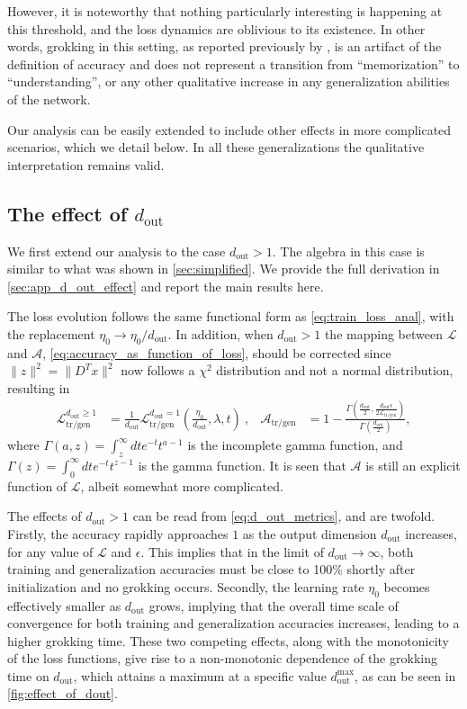 \documentclass[a4paper,11pt]{article}
\newcommand{\loss}{\mathcal{L}}
\newcommand{\norm}[1]{\| #1 \|}
\newcommand{\dout}{d_\mathrm{out}}
\newcommand{\training}{\mathrm{tr}}
\begin{document}
However, it is noteworthy that nothing particularly interesting is happening at this threshold, and the loss dynamics are oblivious to its existence. In other words, grokking in this setting, as reported previously by \cite{liu2023omnigrok}, is an artifact of the definition of accuracy and does not represent a transition from ``memorization'' to ``understanding'', or any other qualitative increase in any generalization abilities of the network.

Our analysis can be easily extended to include other effects in more complicated scenarios, which we detail below. In all these generalizations the qualitative interpretation remains valid.

\subsection{The effect of $\dout$}
\label{sec:d_out_main}
We first extend our analysis to the case $\dout>1$. The algebra in this case is similar to what was shown in \cref{sec:simplified}. We provide the full derivation in \cref{sec:app_d_out_effect} and report the main results here.

The loss evolution follows the same functional form as \cref{eq:train_loss_anal}, with the replacement $\eta_0 \to \eta_0/\dout$. In addition, when $\dout>1$ the mapping between $\loss$ and $\mathcal{A}$, \cref{eq:accuracy_as_function_of_loss}, should be corrected since $\norm{z}^2=\norm{D^Tx}^2$ now follows a $\chi^2$ distribution and not a normal distribution, resulting in
\begin{align}
    \label{eq:d_out_metrics}
    \mathcal{L}_\mathrm{\training/gen}^{\dout\geq 1} 
    &= 
    \frac{1}{\dout} 
    \mathcal{L}_\mathrm{\training/gen}^{\dout= 1} 
    \left( \frac{\eta_0}{\dout }, \lambda, t \right)\ , &
\mathcal{A}_\mathrm{\training/gen} &= 
  1-\frac{\Gamma \left(\frac{\dout}{2},\frac{\dout \epsilon }{2 \mathcal{L}_\mathrm{\training/gen}}\right)}{\Gamma \left(\frac{\dout}{2}\right)},
\end{align}
where $\Gamma (a,z)=\int _z^{\infty }d t  e^{-t}t^{a-1}$ is the incomplete gamma function, and $\Gamma(z)=\int _0^{\infty }d t e^{-t} t^{z-1}$ is the gamma function. It is seen that $\mathcal{A}$ is still an explicit function of $\loss$, albeit somewhat more complicated.

The effects of $\dout>1$ can be read from \cref{eq:d_out_metrics}, and are twofold. Firstly, the accuracy rapidly approaches $1$ as the output dimension $\dout$ increases, for any value of $\loss$ and $\epsilon$. This implies that in the limit of $\dout\to \infty$, both training and generalization accuracies must be close to 100\% shortly after initialization and no grokking occurs. Secondly, the learning rate $\eta_0$ becomes effectively smaller as $\dout$ grows, implying that the overall time scale of convergence for both training and generalization accuracies increases, leading to a higher grokking time. 
%
These two competing effects, along with the monotonicity of the loss functions, give rise to a non-monotonic dependence of the grokking time on $\dout$, which attains a maximum at a specific value $\dout^\mathrm{max}$, as can be seen in \cref{fig:effect_of_dout}.
\end{document}

